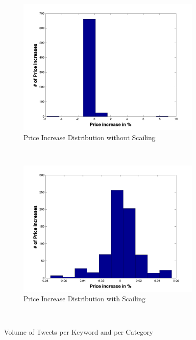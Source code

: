 \begin{figure}[ht]
        \centering
        \begin{subfigure}[b]{0.5\textwidth}
                \includegraphics[width=\textwidth]{img/model/p_increase_n_log}
                \caption{Price Increase Distribution without Scailing}
                \label{fig:u_linear}
        \end{subfigure}%
        ~ %
        \begin{subfigure}[b]{0.5\textwidth}
                \includegraphics[width=\textwidth]{img/model/p_increase_w}
                \caption{Price Increase Distribution with Scailing}
                \label{fig:u_log}
        \end{subfigure}
        ~ %

      
        \caption{Volume of Tweets per Keyword and per Category}\label{fig:distribution_com}
\end{figure}





